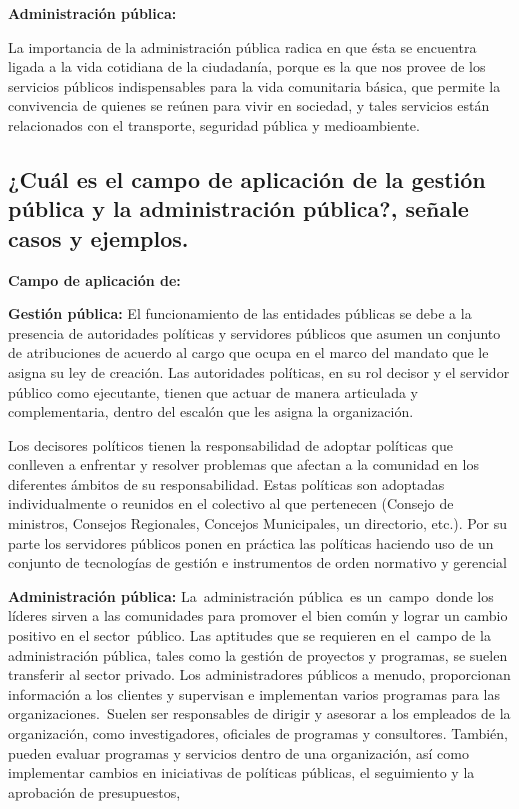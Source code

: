 \documentclass[
  a4paper,
]{article}
\begin{document}
\textbf{Administración pública:}

La importancia de la administración pública radica en que ésta se
encuentra ligada a la vida cotidiana de la ciudadanía, porque es la que
nos provee de los servicios públicos indispensables para la vida
comunitaria básica, que permite la convivencia de quienes se reúnen para
vivir en sociedad, y tales servicios están relacionados con el
transporte, seguridad pública y medioambiente.

\hypertarget{cuuxe1l-es-el-campo-de-aplicaciuxf3n-de-la-gestiuxf3n-puxfablica-y-la-administraciuxf3n-puxfablica-seuxf1ale-casos-y-ejemplos.}{%
\subsection{¿Cuál es el campo de aplicación de la gestión pública y la
administración pública?, señale casos y
ejemplos.}\label{cuuxe1l-es-el-campo-de-aplicaciuxf3n-de-la-gestiuxf3n-puxfablica-y-la-administraciuxf3n-puxfablica-seuxf1ale-casos-y-ejemplos.}}

\textbf{Campo de aplicación de:}

\textbf{Gestión pública:} El funcionamiento de las entidades públicas se
debe a la presencia de autoridades políticas y servidores públicos que
asumen un conjunto de atribuciones de acuerdo al cargo que ocupa en el
marco del mandato que le asigna su ley de creación. Las autoridades
políticas, en su rol decisor y el servidor público como ejecutante,
tienen que actuar de manera articulada y complementaria, dentro del
escalón que les asigna la organización.

Los decisores políticos tienen la responsabilidad de adoptar políticas
que conlleven a enfrentar y resolver problemas que afectan a la
comunidad en los diferentes ámbitos de su responsabilidad. Estas
políticas son adoptadas individualmente o reunidos en el colectivo al
que pertenecen (Consejo de ministros, Consejos Regionales, Concejos
Municipales, un directorio, etc.). Por su parte los servidores públicos
ponen en práctica las políticas haciendo uso de un conjunto de
tecnologías de gestión e instrumentos de orden normativo y gerencial

\textbf{Administración pública:} La~administración pública~es
un~campo~donde los líderes sirven a las comunidades para promover el
bien común y lograr un cambio positivo en el sector~público. Las
aptitudes que se requieren en el~campo de la administración pública,
tales como la gestión de proyectos y programas, se suelen transferir al
sector privado. Los administradores públicos a menudo, proporcionan
información a los clientes y supervisan e implementan varios programas
para las organizaciones.~Suelen ser responsables de dirigir y asesorar a
los empleados de la organización, como investigadores, oficiales de
programas y consultores. También, pueden evaluar programas y servicios
dentro de una organización, así como implementar cambios en iniciativas
de políticas públicas, el seguimiento y la aprobación de presupuestos,
\end{document}

